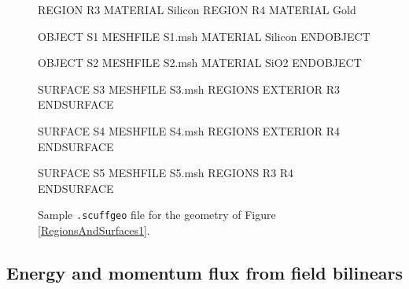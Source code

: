 \documentclass[letterpaper]{article}
\begin{document}
\begin{figure}
\begin{center}
\begin{verbcode}
  REGION R3 MATERIAL Silicon
  REGION R4 MATERIAL Gold

  OBJECT  S1 
	MESHFILE S1.msh
	MATERIAL Silicon
  ENDOBJECT

  OBJECT  S2 
	MESHFILE S2.msh
	MATERIAL SiO2
  ENDOBJECT

  SURFACE S3
        MESHFILE S3.msh
        REGIONS EXTERIOR R3
  ENDSURFACE

  SURFACE S4
        MESHFILE S4.msh
        REGIONS EXTERIOR R4
  ENDSURFACE

  SURFACE S5
        MESHFILE S5.msh
        REGIONS R3 R4
  ENDSURFACE
\end{verbcode}
\end{center}
\caption{Sample \texttt{.scuffgeo} file for the geometry 
         of Figure \ref{RegionsAndSurfaces1}.}
\label{scuffgeoFile}
\end{figure}

\subsection*{Energy and momentum flux from field bilinears}
\end{document}
